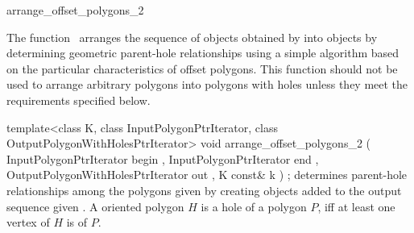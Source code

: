 

\begin{ccRefFunction}{arrange_offset_polygons_2}


\ccDefinition

The function \ccRefName\ arranges the sequence of  objects obtained by  into  objects by determining geometric parent-hole relationships using a simple algorithm based on the particular characteristics of offset polygons. This function should not be used to arrange arbitrary polygons into polygons with holes unless they meet the requirements specified below.


\ccFunction
{template<class K, class InputPolygonPtrIterator, class OutputPolygonWithHolesPtrIterator>
void arrange_offset_polygons_2 ( InputPolygonPtrIterator           begin
                               , InputPolygonPtrIterator           end
                               , OutputPolygonWithHolesPtrIterator out
                               , K const&                          k  
                               ) ;
}
{determines parent-hole relationships among the polygons given by  creating 
 objects added to the output sequence given .
A  oriented polygon $H$ is a hole of a  polygon $P$, iff at least one vertex of $H$ is  of $P$.
}

\ccRequirements


\end{ccRefFunction}
